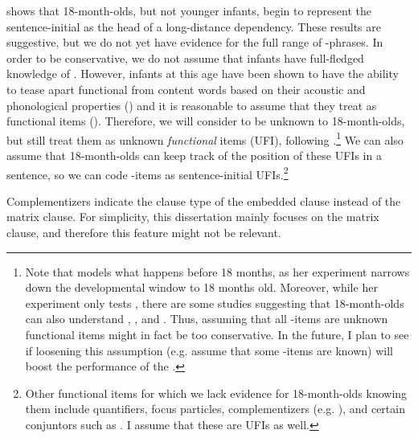  \textcite{perkinslidz2021wh} shows that 18-month-olds, but not younger infants, begin to represent the sentence-initial  as the head of a long-distance dependency. These results are suggestive, but we do not yet have evidence for the full range of \twh-phrases. In order to be conservative, we do not assume that infants have full-fledged knowledge of \twh{}. However, infants at this age have been shown to have the ability to tease apart functional from content words based on their acoustic and phonological properties (\cite{shi1999func,shi2014functional}) and it is reasonable to assume that they treat  as functional items (\cite{perkins2019}). Therefore, we will consider \twh{} to be unknown to 18-month-olds, but still treat them as unknown \emph{functional} items (UFI), following \textcite{perkins2019}.\footnote{Note that \textcite{perkins2019} models what happens before 18 months, as her experiment narrows down the developmental window to 18 months old. Moreover, while her experiment only tests , there are some studies suggesting that 18-month-olds can also understand , , and . Thus, assuming that all \twh-items are unknown functional items might in fact be too conservative. In the future, I plan to see if loosening this assumption (e.g. assume that some \twh-items are known) will boost the performance of the \dlearnerabbr{}.} We can also assume that 18-month-olds can keep track of the position of these UFIs in a sentence, so we can code \twh-items as sentence-initial UFIs.\footnote{Other functional items for which we lack evidence for 18-month-olds knowing them include quantifiers, focus particles, complementizers (e.g. ), and certain conjuntors such as . I assume that these are UFIs as well.} 

 Complementizers indicate the clause type of the embedded clause instead of the matrix clause. For simplicity, this dissertation mainly focuses on the matrix clause, and therefore this feature might not be relevant.  %


